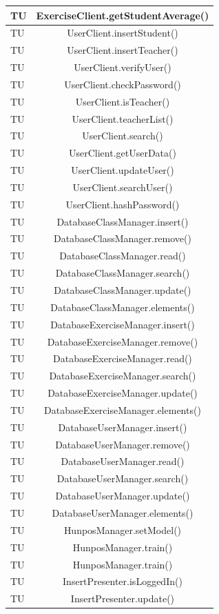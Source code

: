 \begin{longtable}{|>{\centering\arraybackslash}m{1.6cm}|c|}
		TU & ExerciseClient.getStudentAverage()  \\ \hline
		TU & UserClient.insertStudent()  \\ \hline
		TU & UserClient.insertTeacher()  \\ \hline
		TU & UserClient.verifyUser()  \\ \hline
		TU & UserClient.checkPassword()  \\ \hline
		TU & UserClient.isTeacher()  \\ \hline
		TU & UserClient.teacherList()  \\ \hline
		TU & UserClient.search()  \\ \hline
		TU & UserClient.getUserData()  \\ \hline
		TU & UserClient.updateUser()  \\ \hline
		TU & UserClient.searchUser()  \\ \hline
		TU & UserClient.hashPassword()  \\ \hline
		TU & DatabaseClassManager.insert()  \\ \hline
		TU & DatabaseClassManager.remove()  \\ \hline
		TU & DatabaseClassManager.read()  \\ \hline
		TU & DatabaseClassManager.search()  \\ \hline
		TU & DatabaseClassManager.update()  \\ \hline
		TU & DatabaseClassManager.elements()  \\ \hline
		TU & DatabaseExerciseManager.insert()  \\ \hline
		TU & DatabaseExerciseManager.remove()  \\ \hline
		TU & DatabaseExerciseManager.read()  \\ \hline
		TU & DatabaseExerciseManager.search()  \\ \hline
		TU & DatabaseExerciseManager.update()  \\ \hline
		TU & DatabaseExerciseManager.elements()  \\ \hline
		TU & DatabaseUserManager.insert()  \\ \hline
		TU & DatabaseUserManager.remove()  \\ \hline
		TU & DatabaseUserManager.read()  \\ \hline
		TU & DatabaseUserManager.search()  \\ \hline
		TU & DatabaseUserManager.update()  \\ \hline
		TU & DatabaseUserManager.elements()  \\ \hline
		TU & HunposManager.setModel()  \\ \hline
		TU & HunposManager.train()  \\ \hline
		TU & HunposManager.train()  \\ \hline
		TU & InsertPresenter.isLoggedIn()  \\ \hline
		TU & InsertPresenter.update()  \\ \hline
		

\end{longtable}
